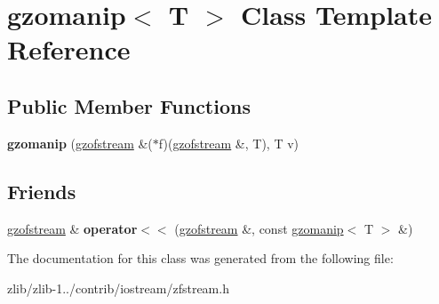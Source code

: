 \hypertarget{classgzomanip}{\section{gzomanip$<$ T $>$ Class Template Reference}
\label{classgzomanip}
}
\subsection*{Public Member Functions}
\begin{DoxyCompactItemize}
\item 
\hypertarget{classgzomanip_a62e624a4096f8d543472895936b80c13}{{\bfseries gzomanip} (\hyperlink{classgzofstream}{gzofstream} \&($\ast$f)(\hyperlink{classgzofstream}{gzofstream} \&, T), T v)}\label{classgzomanip_a62e624a4096f8d543472895936b80c13}

\end{DoxyCompactItemize}
\subsection*{Friends}
\begin{DoxyCompactItemize}
\item 
\hypertarget{classgzomanip_ace1e67eb789a4d1577a12cfcf782f22e}{\hyperlink{classgzofstream}{gzofstream} \& {\bfseries operator$<$$<$} (\hyperlink{classgzofstream}{gzofstream} \&, const \hyperlink{classgzomanip}{gzomanip}$<$ T $>$ \&)}\label{classgzomanip_ace1e67eb789a4d1577a12cfcf782f22e}

\end{DoxyCompactItemize}


The documentation for this class was generated from the following file\+:\begin{DoxyCompactItemize}
\item 
zlib/zlib-\/1../contrib/iostream/zfstream.\+h\end{DoxyCompactItemize}
